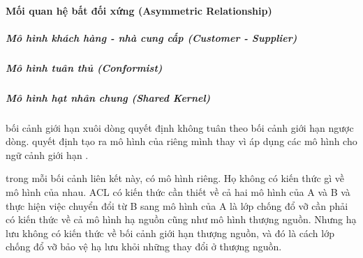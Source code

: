 \documentclass{article} %
\begin{document}
% 
%
%
%
%

\paragraph{Mối quan hệ bất đối xứng (Asymmetric Relationship)}




\subparagraph{Mô hình khách hàng - nhà cung cấp (Customer - Supplier)}



\subparagraph{Mô hình tuân thủ (Conformist)}










 





\subparagraph{Mô hình hạt nhân chung (Shared Kernel)}

% 
%


bối cảnh giới hạn xuôi dòng quyết định không tuân theo bối cảnh giới hạn ngược dòng.
quyết định tạo ra mô hình của riêng mình thay vì áp dụng các mô hình cho ngữ cảnh giới hạn .




trong mỗi bối cảnh liên kết này, có mô hình riêng. Họ không có kiến thức gì về mô hình của nhau.
ACL có kiến thức cần thiết về cả hai mô hình của A và B và thực hiện việc chuyển đổi từ B sang mô hình của A là lớp chống đổ vỡ cần phải có kiến thức về cả mô hình hạ nguồn cũng như mô hình thượng nguồn.
Nhưng hạ lưu không có kiến thức về bối cảnh giới hạn thượng nguồn, và đó là cách lớp chống đổ vỡ bảo vệ hạ lưu khỏi những thay đổi ở thượng nguồn.
\end{document}
